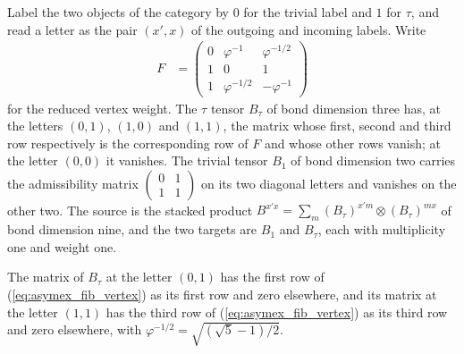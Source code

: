 \begin{definition}
    \label{def:asymex_fib}
    \leanok
    Label the two objects of the category by $0$ for the trivial label and
    $1$ for $\tau$, and read a letter as the pair $(x',x)$ of the outgoing
    and incoming labels. Write
    \begin{align}
        F & =\begin{pmatrix}
                 0 & \varphi^{-1}   & \varphi^{-1/2} \\
                 1 & 0              & 1              \\
                 1 & \varphi^{-1/2} & -\varphi^{-1}
             \end{pmatrix}
        \label{eq:asymex_fib_vertex}
    \end{align}
    for the reduced vertex weight. The $\tau$ tensor $B_\tau$ of bond
    dimension three has, at the letters $(0,1)$, $(1,0)$ and $(1,1)$, the
    matrix whose first, second and third row respectively is the
    corresponding row of $F$ and whose other rows vanish; at the letter
    $(0,0)$ it vanishes. The trivial tensor $B_1$ of bond dimension two
    carries the admissibility matrix
    $\begin{pmatrix}0&1\\1&1\end{pmatrix}$ on its two diagonal letters and
    vanishes on the other two. The source is the stacked product
    $B^{x'x}=\sum_m(B_\tau)^{x'm}\otimes(B_\tau)^{mx}$ of bond dimension
    nine, and the two targets are $B_1$ and $B_\tau$, each with
    multiplicity one and weight one.
\end{definition}

\begin{theorem}
    \label{thm:asymex_fib_entries}
    \leanok
    The matrix of $B_\tau$ at the letter $(0,1)$ has the first row of
    (\ref{eq:asymex_fib_vertex}) as its first row and zero elsewhere, and
    its matrix at the letter $(1,1)$ has the third row of
    (\ref{eq:asymex_fib_vertex}) as its third row and zero elsewhere, with
    $\varphi^{-1/2}=\sqrt{(\sqrt5-1)/2}$.
\end{theorem}

